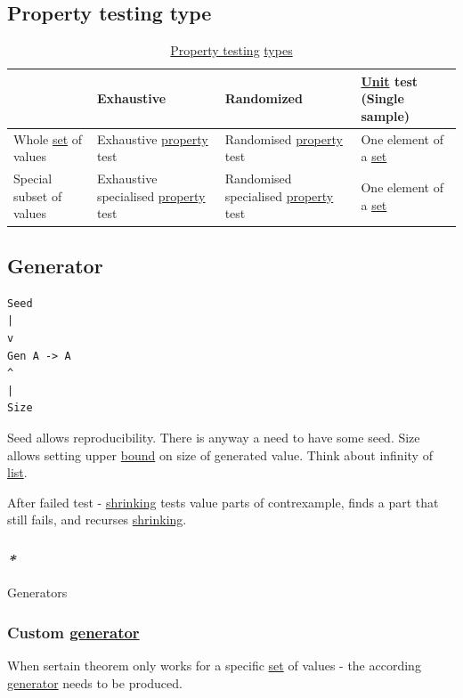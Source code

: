 \documentclass[a4paper,14pt,oneside]{book}
\begin{document}
\subsection{\label{org9d68448}Property testing type}
\label{sec:org4bbc1aa}

\begin{table}[htbp]
\caption{\label{tab--property-testing-type}\hyperref[org9ac8ff6]{Property testing} \hyperref[org737ac49]{types}}
\centering
\begin{tabu} spread \linewidth {llll}
\toprule
 & Exhaustive & Randomized & \hyperref[orgccdcf68]{Unit} test (Single sample)\\
\midrule
Whole \hyperref[org4194165]{set} of values & Exhaustive \hyperref[orgc961e31]{property} test & Randomised \hyperref[orgc961e31]{property} test & One element of a \hyperref[org4194165]{set}\\
Special subset of values & Exhaustive specialised \hyperref[orgc961e31]{property} test & Randomised specialised \hyperref[orgc961e31]{property} test & One element of a \hyperref[org4194165]{set}\\
\bottomrule
\end{tabu}
\end{table}

\subsection{\label{orga9ff459}Generator}
\label{sec:org8b8d7f2}
\begin{verbatim}
Seed
|
v
Gen A -> A
^
|
Size
\end{verbatim}

Seed allows reproducibility.
There is anyway a need to have some seed.
Size allows setting upper \hyperref[org13f8829]{bound} on size of generated value. Think about infinity of \hyperref[org6be22d7]{list}.

After failed test - \hyperref[org29f0cea]{shrinking} tests value parts of contrexample, finds a part that still fails, and recurses \hyperref[org29f0cea]{shrinking}.

\subsubsection{\emph{*}}
\label{sec:org312b605}

\label{orgf157054}Generators

\subsubsection{Custom \hyperref[orga9ff459]{generator}}
\label{sec:org312724b}
When sertain theorem only works for a specific \hyperref[org4194165]{set} of values - the according \hyperref[orga9ff459]{generator} needs to be produced.
\end{document}
